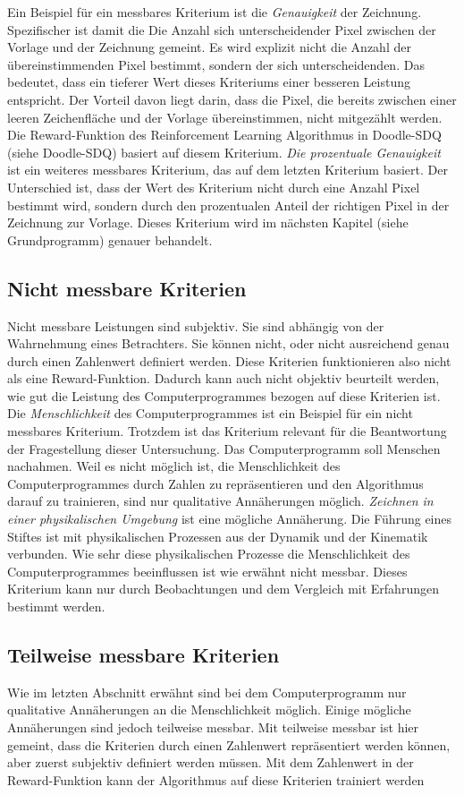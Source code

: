 Ein Beispiel für ein messbares Kriterium ist die \emph{Genauigkeit} der
Zeichnung. Spezifischer ist damit die Die Anzahl sich unterscheidender Pixel
zwischen der Vorlage und der Zeichnung gemeint. Es wird explizit nicht die
Anzahl der übereinstimmenden Pixel bestimmt, sondern der sich unterscheidenden.
Das bedeutet, dass ein tieferer Wert dieses Kriteriums einer besseren Leistung
entspricht. Der Vorteil davon liegt darin, dass die Pixel, die bereits zwischen
einer leeren Zeichenfläche und der Vorlage übereinstimmen, nicht mitgezählt
werden. Die Reward-Funktion des Reinforcement Learning Algorithmus in Doodle-SDQ
(siehe Doodle-SDQ) basiert auf diesem Kriterium.
\emph{Die prozentuale Genauigkeit} ist ein weiteres messbares Kriterium, das auf
dem letzten Kriterium basiert. Der Unterschied ist, dass der Wert des Kriterium
nicht durch eine Anzahl Pixel bestimmt wird, sondern durch den prozentualen
Anteil der richtigen Pixel in der Zeichnung zur Vorlage. Dieses Kriterium wird
im nächsten Kapitel (siehe Grundprogramm) genauer behandelt.


\subsection*{Nicht messbare Kriterien}
Nicht messbare Leistungen sind subjektiv. Sie sind abhängig von der Wahrnehmung
eines Betrachters. Sie können nicht, oder nicht ausreichend genau durch einen
Zahlenwert definiert werden. Diese Kriterien funktionieren also nicht als eine
Reward-Funktion. Dadurch kann auch nicht objektiv beurteilt werden, wie gut die
Leistung des Computerprogrammes bezogen auf diese Kriterien ist. Die
\emph{Menschlichkeit} des Computerprogrammes ist ein Beispiel für ein nicht
messbares Kriterium. Trotzdem ist das Kriterium relevant für die Beantwortung
der Fragestellung dieser Untersuchung. Das Computerprogramm soll Menschen nachahmen.
Weil es nicht möglich ist, die Menschlichkeit des Computerprogrammes durch
Zahlen zu repräsentieren und den Algorithmus darauf zu trainieren, sind nur
qualitative Annäherungen möglich. 
\emph{Zeichnen in einer physikalischen Umgebung} ist eine mögliche Annäherung.
Die Führung eines Stiftes ist mit physikalischen Prozessen aus der Dynamik und
der Kinematik verbunden. Wie sehr diese physikalischen Prozesse die
Menschlichkeit des Computerprogrammes beeinflussen ist wie erwähnt nicht
messbar. Dieses Kriterium kann nur durch Beobachtungen und dem Vergleich mit
Erfahrungen bestimmt werden.

\subsection*{Teilweise messbare Kriterien}
Wie im letzten Abschnitt erwähnt sind bei dem Computerprogramm nur qualitative
Annäherungen an die Menschlichkeit möglich. Einige mögliche Annäherungen sind
jedoch teilweise messbar. Mit teilweise messbar ist hier gemeint, dass die
Kriterien durch einen Zahlenwert repräsentiert werden können, aber zuerst
subjektiv definiert werden müssen. Mit dem Zahlenwert in der Reward-Funktion
kann der Algorithmus auf diese Kriterien trainiert werden 

